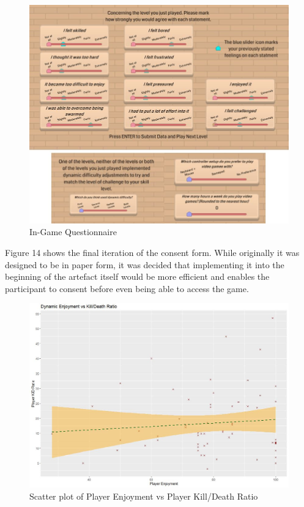 \documentclass[journal]{IEEEtran}
\begin{document}
\begin{figure}[h]
	\includegraphics[width=0.75\linewidth]{questionnaireingame.jpg}
	\caption{In-Game Questionnaire}
	\label{Analysis Test}
\end{figure} 



Figure 14 shows the final iteration of the consent form. While originally it was designed to be in paper form, it was decided that implementing it into the beginning of the artefact itself would be more efficient and enables the participant to consent before even being able to access the game.

\begin{figure}[h]
	\includegraphics[width=0.75\linewidth]{dynamicfunKDR.jpg}
	\caption{Scatter plot of Player Enjoyment vs Player Kill/Death Ratio}
	\label{Analysis Test}
\end{figure} 
\end{document}
